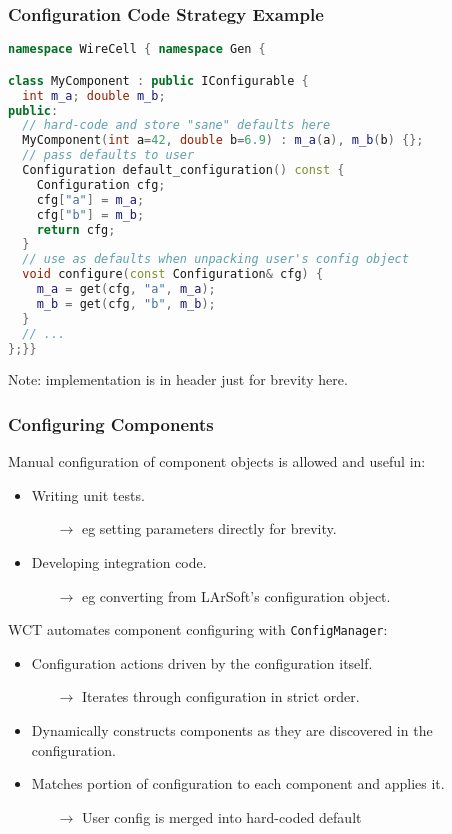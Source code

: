 \documentclass[xcolor=dvipsnames]{beamer}
\def\ls{LArSoft\xspace}
\begin{document}
\begin{frame}[fragile]
  \frametitle{Configuration Code Strategy Example}

\begin{lstlisting}[language=C++]
namespace WireCell { namespace Gen {

class MyComponent : public IConfigurable {
  int m_a; double m_b;
public:
  // hard-code and store "sane" defaults here
  MyComponent(int a=42, double b=6.9) : m_a(a), m_b(b) {};
  // pass defaults to user
  Configuration default_configuration() const {
    Configuration cfg;
    cfg["a"] = m_a;
    cfg["b"] = m_b;
    return cfg;
  }
  // use as defaults when unpacking user's config object
  void configure(const Configuration& cfg) {
    m_a = get(cfg, "a", m_a);
    m_b = get(cfg, "b", m_b);
  }
  // ...
};}}
\end{lstlisting}

\footnotesize
Note: implementation is in header just for brevity here.
\end{frame}

\begin{frame}
  \frametitle{Configuring Components}

  Manual configuration of component objects is allowed and useful in:
  \begin{itemize}\footnotesize
  \item Writing unit tests.
    \begin{itemize}\scriptsize
    \item[$\to$] eg setting parameters directly for brevity.
    \end{itemize}
  \item Developing integration code.
    \begin{itemize}\scriptsize
    \item[$\to$] eg converting from \ls's
    configuration object.
    \end{itemize}
  \end{itemize}

  WCT automates component configuring with \texttt{ConfigManager}:
  \begin{itemize}\footnotesize
  \item Configuration actions driven by the configuration itself.
    \begin{itemize}\scriptsize
    \item[$\to$] Iterates through configuration in strict order. 
    \end{itemize}
  \item Dynamically constructs components as they are discovered in
    the configuration.
  \item Matches portion of configuration to each component and applies
    it.
    \begin{itemize}\scriptsize
    \item[$\to$] User config is merged into hard-coded default
    \end{itemize}
  \end{itemize}
\end{frame}
\end{document}
